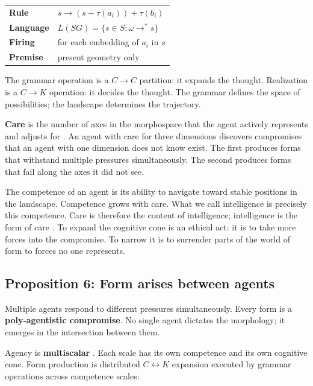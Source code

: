 \begin{center}\small
\begin{tabular}{@{}l@{\;\;}l@{}}
\textbf{Rule} & $s \!\to\! (s - \tau(a_i)) + \tau(b_i)$ \\[2pt]
\textbf{Language} & $L(SG) = \{s \!\in\! S : \omega \!\to^*\! s\}$ \\[2pt]
\textbf{Firing} & for each embedding of $a_i$ in $s$ \\
\textbf{Premise} & present geometry only \\
\end{tabular}
\end{center}

\noindent The grammar operation is a $C \to C$ partition: it expands the thought. Realization is a $C \to K$ operation: it decides the thought. The grammar defines the space of possibilities; the landscape determines the trajectory.

\textbf{Care} is the number of axes in the morphospace that the agent actively represents and adjusts for \parencite{Doctor2024}. An agent with care for three dimensions discovers compromises that an agent with one dimension does not know exist. The first produces forms that withstand multiple pressures simultaneously. The second produces forms that fail along the axes it did not see.

The competence of an agent is its ability to navigate toward stable positions in the landscape. Competence grows with care. What we call intelligence is precisely this competence. Care is therefore the content of intelligence; intelligence is the form of care \parencite{Doctor2024}. To expand the cognitive cone is an ethical act: it is to take more forces into the compromise. To narrow it is to surrender parts of the world of form to forces no one represents.

\subsection{Proposition 6: Form arises between agents}
\label{sec:prop6}

Multiple agents respond to different pressures simultaneously. Every form is a \textbf{poly-agentistic compromise}. No single agent dictates the morphology; it emerges in the intersection between them.

Agency is \textbf{multiscalar} \parencite{Levin2022}. Each scale has its own competence and its own cognitive cone. Form production is distributed $C \leftrightarrow K$ expansion executed by grammar operations across competence scales:

